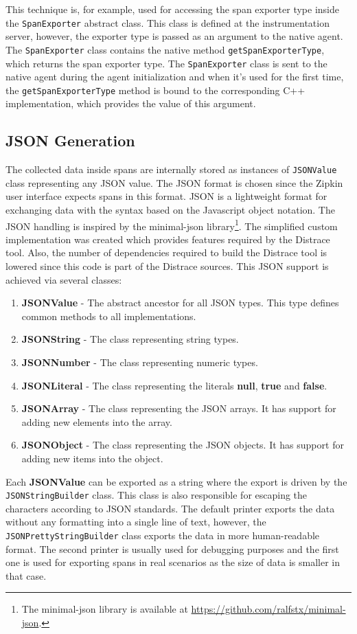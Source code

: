 This technique is, for example, used for accessing the span exporter type inside the \texttt{SpanExporter} abstract class. This class is defined at the instrumentation server, however, the exporter type is passed as an argument to the native agent. The \texttt{SpanExporter} class contains the native method \texttt{getSpanExporterType}, \linebreak which returns the span exporter type. The \texttt{SpanExporter} class is sent to the native agent during the agent initialization and when it's used for the first time, the \texttt{getSpanExporterType} method is bound to the corresponding C++ implementation, which provides the value of this argument.

\subsection{JSON Generation}
\label{json_gen}

The collected data inside spans are internally stored as instances of \texttt{JSONValue} class representing any JSON value. The JSON format is chosen since the Zipkin user interface expects spans in this format. JSON is a lightweight format for exchanging data with the syntax based on the Javascript object notation. The JSON handling is inspired by the minimal-json library\footnote{The minimal-json library is available at \url{https://github.com/ralfstx/minimal-json}.}. The simplified custom implementation was created which provides features required by the Distrace tool. Also, the number of dependencies required to build the Distrace tool is lowered since this code is part of the Distrace sources. This JSON support is achieved via several classes:
\begin{enumerate}
	\item \textbf{JSONValue} - The abstract ancestor for all JSON types. This type defines common methods to all implementations.
	\item \textbf{JSONString} - The class representing string types.
	\item \textbf{JSONNumber} - The class representing numeric types.
	\item \textbf{JSONLiteral} - The class representing the literals \textbf{null}, \textbf{true} and \textbf{false}.
	\item \textbf{JSONArray} - The class representing the JSON arrays. It has support for adding new elements into the array.
	\item \textbf{JSONObject} - The class representing the JSON objects. It has support for adding new items into the object.
\end{enumerate}

Each \textbf{JSONValue} can be exported as a string where the export is driven by the \texttt{JSONStringBuilder} class. This class is also responsible for escaping the characters according to JSON standards. The default printer exports the data without any formatting into a single line of text, however, the \texttt{JSONPrettyStringBuilder} class exports the data in more human-readable format. The second printer is usually used for debugging purposes and the first one is used for exporting spans in real scenarios as the size of data is smaller in that case.


